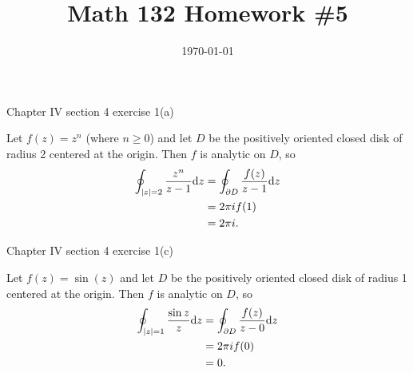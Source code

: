 \documentclass{article}
\date{\today}
\title{Math 132 Homework \#5}
\begin{document}
\maketitle

\begin{prob}
    Chapter IV section 4 exercise 1(a)
\end{prob}
Let $f(z)=z^n$ (where $n \geq 0$) and let $D$ be the positively oriented closed disk of radius 2 centered at the origin. Then $f$ is analytic on $D$, so
\begin{align*}
    \oint_{\left\lvert z \right\rvert=2} \frac{z^n}{z-1} \mathrm{d} z &= \oint_{\partial D} \frac{f(z)}{z-1} \mathrm{d} z \\
                                           &= 2 \pi i f(1) \\
                                           &= 2 \pi i.
\end{align*}

\bigskip
\par
\begin{prob}
    Chapter IV section 4 exercise 1(c)
\end{prob}
Let $f(z)=\sin(z)$ and let $D$ be the positively oriented closed disk of radius 1 centered at the origin. Then $f$ is analytic on $D$, so
\begin{align*}
    \oint_{\left\lvert z \right\rvert=1} \frac{\sin z}{z} \mathrm{d} z &= \oint_{\partial D} \frac{f(z)}{z-0} \mathrm{d} z \\
                                           &= 2 \pi i f(0) \\
                                           &= 0.
\end{align*}
\end{document}
